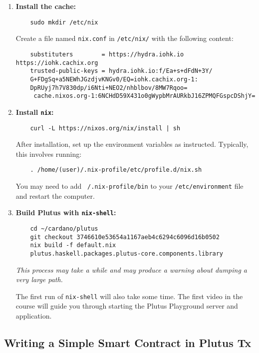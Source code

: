 \begin{enumerate}
    \item \textbf{Install the cache:}
    \begin{verbatim}
    sudo mkdir /etc/nix
    \end{verbatim}
    Create a file named \texttt{nix.conf} in \texttt{/etc/nix/} with the following content:
    \begin{verbatim}
    substituters        = https://hydra.iohk.io https://iohk.cachix.org 
    trusted-public-keys = hydra.iohk.io:f/Ea+s+dFdN+3Y/
    G+FDgSq+a5NEWhJGzdjvKNGv0/EQ=iohk.cachix.org-1:
    DpRUyj7h7V830dp/i6Nti+NEO2/nhblbov/8MW7Rqoo= 
     cache.nixos.org-1:6NCHdD59X431o0gWypbMrAURkbJ16ZPMQFGspcDShjY=
    \end{verbatim}
    
    \item \textbf{Install \texttt{nix}:}
    \begin{verbatim}
    curl -L https://nixos.org/nix/install | sh
    \end{verbatim}
    After installation, set up the environment variables as instructed. Typically, this involves running:
    \begin{verbatim}
    . /home/(user)/.nix-profile/etc/profile.d/nix.sh
    \end{verbatim}
    You may need to add \texttt{~/.nix-profile/bin} to your \texttt{/etc/environment} file and restart the computer.
    
    \item \textbf{Build Plutus with \texttt{nix-shell}:}
    \begin{verbatim}
    cd ~/cardano/plutus
    git checkout 3746610e53654a1167aeb4c6294c6096d16b0502
    nix build -f default.nix 
    plutus.haskell.packages.plutus-core.components.library
    \end{verbatim}
    \textit{This process may take a while and may produce a warning about dumping a very large path.}
    
    The first run of \texttt{nix-shell} will also take some time. The first video in the course will guide you through starting the Plutus Playground server and application.
\end{enumerate}





\subsection{Writing a Simple Smart Contract in Plutus Tx}

